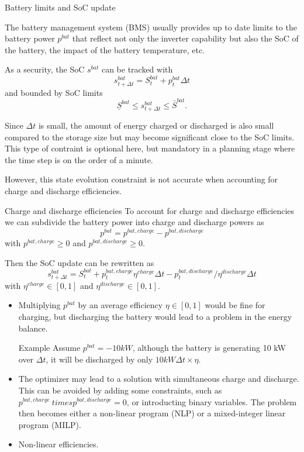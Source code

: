 \begin{frame}[allowframebreaks]{Battery limits and SoC update}

    The battery management system (BMS) usually provides up to date limits to the battery power
    $p^{bat}$ that reflect not only the inverter capability but also the SoC of the battery, the impact of the battery temperature, etc.
    
    As a security, the SoC $s^{bat}$ can be tracked with 
    $$s^{bat}_{t+\Delta t} = S^{bat}_{t} + p^{bat}_t  \Delta t$$
    and bounded by SoC limits
    $$ \underline{S}^{bat} \leq s^{bat}_{t+\Delta t} \leq \bar{S}^{bat}.$$

    Since $\Delta t$ is small, the amount of energy charged or discharged is also small compared to the storage size but may become significant close to the SoC limits.
    This type of contraint is optional here, but mandatory in a planning stage where the time step is on the order of a minute.

    However, this state evolution constraint is not accurate when accounting for charge and discharge efficiencies.
\end{frame}

\begin{frame}[allowframebreaks]{Charge and discharge efficiencies}
    To account for charge and discharge efficiencies we can subdivide the battery power into charge and discharge powers as 
    $$ p^{bat} = p^{bat, charge} - p^{bat, discharge}$$
    with $p^{bat, charge} \geq 0$ and $p^{bat, discharge} \geq 0$.

    Then the SoC update can be rewritten as
    $$s^{bat}_{t+\Delta t} = S^{bat}_{t} + p^{bat, charge}_t  \eta^{charge} \Delta t - p^{bat, discharge}_t / \eta^{discharge} \Delta t $$
    with $\eta^{charge} \in [0,1]$ and $\eta^{discharge} \in [0,1]$.

    \begin{itemize}
        \item Multiplying $p^{bat}$ by an average efficiency $\eta \in [0,1]$ would be fine for charging, but discharging the battery would lead to a problem in the energy balance.
        \begin{block}{Example}
            Assume $p^{bat} = -10 kW$, although the battery is generating 10 kW over $\Delta t$, it will be discharged by only $10 kW \Delta t \times \eta$.    
        \end{block}
        \item The optimizer may lead to a solution with simultaneous charge and discharge. 
        This can be avoided by adding some constraints, such as $p^{bat, charge}\ times p^{bat, discharge} = 0$, or introducting binary variables. The problem then becomes either a non-linear program (NLP) or a mixed-integer linear program (MILP).
        \item Non-linear efficiencies.
    \end{itemize}
\end{frame}

